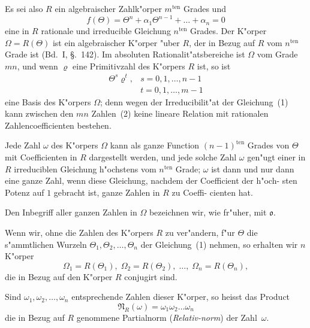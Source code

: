 \documentclass[12pt,a4paper]{article}
\theoremstyle{weber}
\begin{document}
Es sei also $R$ ein algebraischer Zahlk"orper $m^{\mathrm{ten}}$ Grades und
\begin{equation}\label{eq:s159-1}
f(\varTheta) = \varTheta^n + \alpha_1\varTheta^{n-1} + \dots + \alpha_n = 0
\end{equation}
eine in $R$ rationale und irreducible Gleichung $n^{\mathrm{ten}}$ Grades. Der
K"orper $\varOmega = R(\varTheta)$ ist ein algebraischer K"orper "uber $R$, der in
Bezug auf $R$ vom $n^{\mathrm{ten}}$ Grade ist (Bd.~I, \S.~142). Im absoluten
Rationalit"atsbereiche ist $\varOmega$ vom Grade $mn$, und wenn $\varrho$ eine
Primitivzahl des K"orpers $R$ ist, so ist
\begin{equation}\label{eq:s159-2}
\begin{array}{ll}
\varTheta^s\varrho^t, & s = 0, 1, \dots, n-1 \\
                 & t = 0, 1, \dots, m-1
\end{array}
\end{equation}
eine Basis des K"orpers $\varOmega$; denn wegen der Irreducibilit"at der
Gleichung~(1) kann zwischen den $mn$ Zahlen~(2) keine lineare
Relation mit rationalen Zahlencoefficienten bestehen.

Jede Zahl $\omega$ des K"orpers $\varOmega$ kann als ganze Function
$(n-1)^{\mathrm{ten}}$ Grades von $\varTheta$ mit Coefficienten in $R$ dargestellt werden,
und jede solche Zahl $\omega$ gen"ugt einer in $R$ irreduciblen Gleichung
h"ochstens vom $n^{\mathrm{ten}}$ Grade; $\omega$ ist dann und nur dann eine ganze
Zahl, wenn diese Gleichung, nachdem der Coefficient der h"och-
sten Potenz auf $1$ gebracht ist, ganze Zahlen in $R$ zu Coeffi-
cienten hat.

Den Inbegriff aller ganzen Zahlen in $\varOmega$ bezeichnen wir, wie
fr"uher, mit $\mathfrak{o}$.

Wenn wir, ohne die Zahlen des K"orpers $R$ zu ver"andern,
f"ur $\varTheta$ die s"ammtlichen Wurzeln $\varTheta_1, \varTheta_2, \dots, \varTheta_n$ der Gleichung~(1)
nehmen, so erhalten wir $n$ K"orper
\begin{equation}\label{eq:s159-3}
\varOmega_1 = R(\varTheta_1),\; \varOmega_2 = R(\varTheta_2),\; \dots,\; \varOmega_n = R(\varTheta_n),
\end{equation}
die in Bezug auf den K"orper $R$ conjugirt sind.

Sind $\omega_1, \omega_2, \dots, \omega_n$ entsprechende Zahlen dieser K"orper, so
heisst das Product
\begin{equation}\label{eq:s159-4}
\mathfrak{N}_R(\omega) = \omega_1\omega_2\dots\omega_n
\end{equation}
die in Bezug auf $R$ genommene Partialnorm (\emph{Relativ-\allowbreak norm}) der Zahl~$\omega$.
\end{document}
